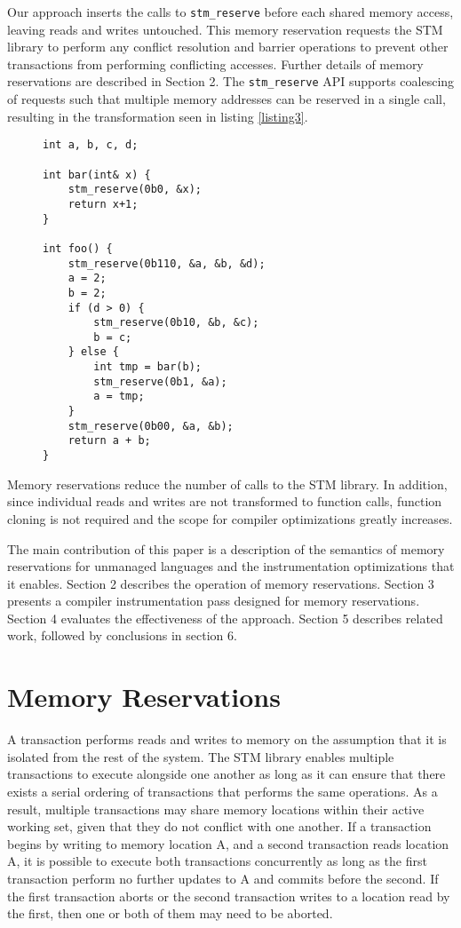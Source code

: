 \documentclass[preprint]{sigplanconf}
\begin{document}
Our approach inserts the calls to \verb+stm_reserve+ before each shared memory access, leaving reads and writes untouched. This memory reservation requests the STM library to perform any conflict resolution and barrier operations to prevent other transactions from performing conflicting accesses. Further details of memory reservations are described in Section 2. The \verb+stm_reserve+ API supports coalescing of requests such that multiple memory addresses can be reserved in a single call, resulting in the transformation seen in listing \ref{listing3}.

\begin{figure}[h]
    \begin{lstlisting}[caption={STM instrumentation with memory reservations},label=listing3,captionpos=b]
int a, b, c, d;

int bar(int& x) {
    stm_reserve(0b0, &x);
    return x+1;
}

int foo() {
    stm_reserve(0b110, &a, &b, &d);
    a = 2;
    b = 2;
    if (d > 0) {
        stm_reserve(0b10, &b, &c);
        b = c;
    } else {
        int tmp = bar(b);
        stm_reserve(0b1, &a);
        a = tmp;
    }
    stm_reserve(0b00, &a, &b);
    return a + b;
}
\end{lstlisting}
\end{figure}

Memory reservations reduce the number of calls to the STM library. In addition, since individual reads and writes are not transformed to function calls, function cloning is not required and the scope for compiler optimizations greatly increases.

The main contribution of this paper is a description of the semantics of memory reservations for unmanaged languages and the instrumentation optimizations that it enables. Section 2 describes the operation of memory reservations. Section 3 presents a compiler instrumentation pass designed for memory reservations. Section 4 evaluates the effectiveness of the approach. Section 5 describes related work, followed by conclusions in section 6.

\section{Memory Reservations}

A transaction performs reads and writes to memory on the assumption that it is isolated from the rest of the system. The STM library enables multiple transactions to execute alongside one another as long as it can ensure that there exists a serial ordering of transactions that performs the same operations. As a result, multiple transactions may share memory locations within their active working set, given that they do not conflict with one another. If a transaction begins by writing to memory location A, and a second transaction reads location A, it is possible to execute both transactions concurrently as long as the first transaction perform no further updates to A and commits before the second. If the first transaction aborts or the second transaction writes to a location read by the first, then one or both of them may need to be aborted.
\end{document}
